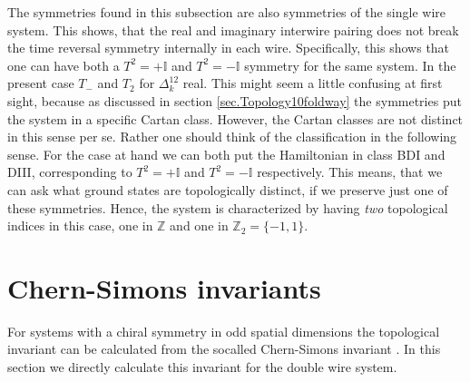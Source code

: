 The symmetries found in this subsection are also symmetries of the single wire system. This shows, that the real and imaginary interwire pairing does not break the time reversal symmetry internally in each wire. Specifically, this shows that one can have both a $T^2 = +\mathbb{I}$ and $T^2 = -\mathbb{I}$ symmetry for the same system. In the present case $T_-$ and $T_2$ for $\Delta^{12}_k$ real. This might seem a little confusing at first sight, because as discussed in section \ref{sec.Topology10foldway} the symmetries put the system in a specific Cartan class. However, the Cartan classes are not distinct in this sense per se. Rather one should think of the classification in the following sense. For the case at hand we can both put the Hamiltonian in class BDI and DIII, corresponding to $T^2 = +\mathbb{I}$ and $T^2=-\mathbb{I}$ respectively. This means, that we can ask what ground states are topologically distinct, if we preserve just one of these symmetries. Hence, the system is characterized by having \textit{two} topological indices in this case, one in $\mathbb{Z}$ and one in $\mathbb{Z}_2 = \{-1,1\}$.

\section{Chern-Simons invariants}
\label{sec.2wires_CSinv}
For systems with a chiral symmetry in odd spatial dimensions the topological invariant can be calculated from the socalled Chern-Simons invariant \cite{Ryu.Topology}. In this section we directly calculate this invariant for the double wire system.

